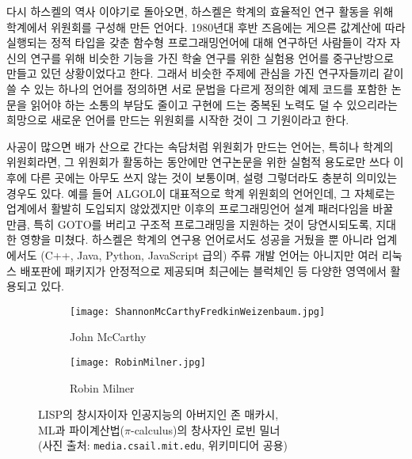 다시 하스켈의 역사\cite{Hudak2007HistoryHaskell} 이야기로 돌아오면,
하스켈은 학계의 효율적인 연구 활동을 위해 학계에서 위원회를 구성해 만든 언어다.
1980년대 후반 즈음에는 게으른 값계산에 따라 실행되는 정적 타입을 갖춘
함수형 프로그래밍언어에 대해 연구하던 사람들이 각자 자신의 연구를 위해
비슷한 기능을 가진 학술 연구를 위한 실험용 언어를 중구난방으로 만들고
있던 상황이었다고 한다. 그래서 비슷한 주제에 관심을 가진 연구자들끼리
같이 쓸 수 있는 하나의 언어를 정의하면 서로 문법을 다르게 정의한 예제
코드를 포함한 논문을 읽어야 하는 소통의 부담도 줄이고 구현에 드는 중복된
노력도 덜 수 있으리라는 희망으로 새로운 언어를 만드는 위원회를 시작한 것이
그 기원이라고 한다.

사공이 많으면 배가 산으로 간다는 속담처럼 위원회가 만드는 언어는,
특히나 학계의 위원회라면, 그 위원회가 활동하는 동안에만 연구논문을
위한 실험적 용도로만 쓰다 이후에 다른 곳에는 아무도 쓰지 않는 것이 보통이며,
설령 그렇더라도 충분히 의미있는 경우도 있다. 예를 들어 ALGOL이 대표적으로
학계 위원회의 언어인데, 그 자체로는 업계에서 활발히 도입되지 않았겠지만
이후의 프로그래밍언어 설계 패러다임을 바꿀 만큼, 특히 GOTO를 버리고
구조적 프로그래밍을 지원하는 것이 당연시되도록, 지대한 영향을 미쳤다.
하스켈은 학계의 연구용 언어로서도 성공을 거뒀을 뿐 아니라 업계에서도
(C++, Java, Python, JavaScript 급의) 주류 개발 언어는 아니지만 여러
리눅스 배포판에 패키지가 안정적으로 제공되며 최근에는
블럭체인\cite{Seijas2020Marlowe} 등 다양한 영역에서 활용되고 있다.

\begin{figure}\centering
\begin{subfigure}{.3\textwidth}\centering
\texttt{[image: ShannonMcCarthyFredkinWeizenbaum.jpg]}
\caption{John McCarthy}
\end{subfigure}
\qquad\qquad
\begin{subfigure}{.3\textwidth}\centering
\texttt{[image: RobinMilner.jpg]}
\caption{Robin Milner}
\end{subfigure}
\caption{LISP의 창시자이자 인공지능의 아버지인 존 매카시,\\
         ML과 파이계산법($\pi$-calculus)의 창사자인 로빈 밀너\\
         {\footnotesize(사진 출처: \texttt{media.csail.mit.edu},
                        위키미디어 공용)}
	 \label{fig:McCarthyMilner} }
\end{figure}

